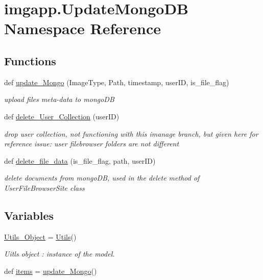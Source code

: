 \hypertarget{namespaceimgapp_1_1UpdateMongoDB}{}\section{imgapp.\+Update\+Mongo\+DB Namespace Reference}
\label{namespaceimgapp_1_1UpdateMongoDB}
\subsection*{Functions}
\begin{DoxyCompactItemize}
\item 
def \hyperlink{namespaceimgapp_1_1UpdateMongoDB_a5bc486192c38922a65cc60e598bc9b1e}{update\+\_\+\+Mongo} (Image\+Type, Path, timestamp, user\+ID, is\+\_\+file\+\_\+flag)
\begin{DoxyCompactList}\small\item\em upload file\textquotesingle{}s meta-\/data to mongo\+DB \end{DoxyCompactList}\item 
def \hyperlink{namespaceimgapp_1_1UpdateMongoDB_aa239083b46ac5a0d725fa61e8068553b}{delete\+\_\+\+User\+\_\+\+Collection} (user\+ID)
\begin{DoxyCompactList}\small\item\em drop user collection, not functioning with this imanage branch, but given here for reference issue\+: user filebrowser folders are not different \end{DoxyCompactList}\item 
def \hyperlink{namespaceimgapp_1_1UpdateMongoDB_ac48df6f990520cda63813e27faa06095}{delete\+\_\+file\+\_\+data} (is\+\_\+file\+\_\+flag, path, user\+ID)
\begin{DoxyCompactList}\small\item\em delete documents from mongo\+DB, used in the delete method of User\+File\+Browser\+Site class \end{DoxyCompactList}\end{DoxyCompactItemize}
\subsection*{Variables}
\begin{DoxyCompactItemize}
\item 
\hyperlink{namespaceimgapp_1_1UpdateMongoDB_a5b8548ed7b19bb6f553a7c052c778406}{Utils\+\_\+\+Object} = \hyperlink{classimgapp_1_1utils_1_1Utils}{Utils}()
\begin{DoxyCompactList}\small\item\em Uitls object \+: instance of the model. \end{DoxyCompactList}\item 
def \hyperlink{namespaceimgapp_1_1UpdateMongoDB_ae23d58bb055998ec921a4a52cdc001f9}{items} = \hyperlink{namespaceimgapp_1_1UpdateMongoDB_a5bc486192c38922a65cc60e598bc9b1e}{update\+\_\+\+Mongo}(\textquotesingle{}\textquotesingle{})
\end{DoxyCompactItemize}


